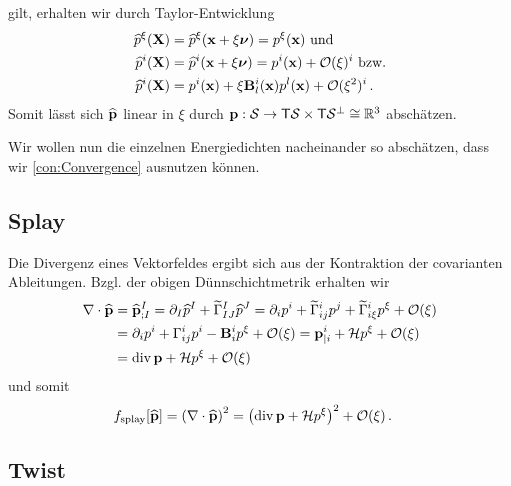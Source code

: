 \documentclass[a4paper,11pt]{scrartcl}
\newcommand{\landau}{\mathcal{O}}
\newcommand{\tildeCh}[3]{\widetilde{\Gamma}_{#1 #2}^{#3}} %
\newcommand{\Ch}[3]{\Gamma_{#1 #2}^{#3}} %
\begin{document}
gilt, erhalten wir durch Taylor-Entwicklung
\begin{align}
  \pIExt^{\xi}(\Xb) &= \pIExt^{\xi}(\xb + \xi\surfNormal) = p^{\xi}(\xb)
  \text{ und} \\
  \pIExt^{i}(\Xb) &= \pIExt^{i}(\xb + \xi\surfNormal)
                   = p^{i}(\xb) + \landau(\xi)^{i}
  \text{ bzw.} \\
  \pIExt^{i}(\Xb) &=  p^{i}(\xb) + \xi\tensor{B}{_{l}^{i}}(\xb)p^{l}(\xb) + \landau(\xi^{2})^{i} \formPeriod
\end{align}
Somit lässt sich \( \widehat{\mathbf{p}} \) linear in \( \xi \) durch 
\( \mathbf{p}:\mathcal{S} \rightarrow \mathsf{T}\mathcal{S}\times\mathsf{T}\mathcal{S}^{\bot} \cong \mathbb{R}^{3} \) abschätzen.

Wir wollen nun die einzelnen Energiedichten nacheinander so abschätzen, dass wir \autoref{con:Convergence} ausnutzen können.

\subsection{Splay}

Die Divergenz eines Vektorfeldes ergibt sich aus der Kontraktion der covarianten Ableitungen.
Bzgl. der obigen Dünnschichtmetrik erhalten wir
\begin{align}
  \nabla\cdot\pExt &= \tensor{\pIExt}{^{I}_{;I}}
                    = \partial_{I} \pIExt^{I} + \tildeCh{I}{J}{I} \pIExt^{J}
                    = \partial_{i} p^{i} + \tildeCh{i}{j}{i} p^{j} + \tildeCh{i}{\xi}{i} p^{\xi} + \landau(\xi)\\
                   &= \partial_{i} p^{i} + \Ch{i}{j}{i} p^{i} - \tensor{B}{_{i}^{i}} p^{\xi} + \landau(\xi)
                    = \tensor{p}{^{i}_{|i}} + \meanCurvature p^{\xi} + \landau(\xi)\\
                   &= \div{\pb} + \meanCurvature p^{\xi} + \landau(\xi) 
\end{align}
und somit
\begin{align}
  f_{\text{splay}}[\pExt] &= \left( \nabla\cdot\pExt \right)^{2} 
        = \left( \div{\pb} + \meanCurvature p^{\xi} \right)^{2} + \landau(\xi) \formPeriod
\end{align}

\subsection{Twist}
\end{document}
